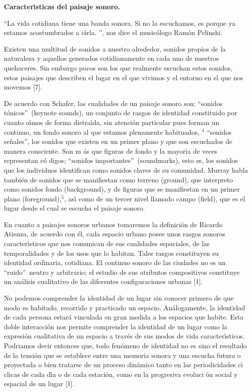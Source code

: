 \textbf{ Caracter\'{\i}sticas del paisaje sonoro.}

\textquotedblleft La vida cotidiana tiene una banda sonora. Si no la
escuchamos, es porque ya estamos acostumbrados a o\'{\i}rla.%
\textquotedblright , nos dice el music\'{o}logo Ram\'{o}n Pelinski.

Existen una multitud de sonidos a nuestro alrededor, sonidos propios de la
naturaleza y aquellos generados cotidianamente en cada uno de nuestros
quehaceres. Sin embargo pocos son los que realmente escuchan estos sonidos,
estos paisajes que describen el lugar en el que vivimos y el entorno en el
que nos movemos [7].

De acuerdo con Schafer, las cualidades de un paisaje sonoro son:
\textquotedblleft sonidos t\'{o}nicos\textquotedblright\ (keynote sounds),
un conjunto de rasgos de identidad constituido por cuanto o\'{\i}mos de
forma distra\'{\i}da, sin atenci\'{o}n particular pues forman un continuo,
un fondo sonoro al que estamos plenamente habituados, $^{4}$
\textquotedblleft sonidos se\~{n}ales\textquotedblright , los sonidos que
existen en un primer plano y que son escuchados de manera consciente. Son m%
\'{a}s que figuras de fondo y la mayor\'{\i}a de veces representan c\'{o}%
digos; \textquotedblleft sonidos importantes\textquotedblright\
(soundmarks), esto es, los sonidos que los individuos identifican como
sonidos claves de su comunidad. Murray habla tambi\'{e}n de sonidos que se
manifiestan como terreno (ground), que interpreto como sonidos fondo
(background), y de figuras que se manifiestan en un primer plano
(foreground),$^{5}$, as\'{\i} como de un tercer nivel llamado campo (field),
que es el lugar desde el cual se escucha el paisaje sonoro.

En cuanto a paisajes sonoros urbanos tomaremos la definici\'{o}n de Ricardo
Atienza, de acuerdo con \'{e}l, cada espacio urbano posee unos rasgos
sonoros caracter\'{\i}sticos que nos comunican de sus cualidades espaciales,
de las temporalidades y de los usos que lo habitan. Tales rasgos constituyen
su identidad ordinaria, cotidiana. El continuo sonoro de las ciudades no es
un \textquotedblleft ruido\textquotedblright\ neutro y arbitrario; el
estudio de sus atributos compositivos constituye un an\'{a}lisis cualitativo
de las diferentes configuraciones urbanas [1].

No podemos comprender la identidad de un lugar sin conocer primero de que
modo es habitado, recorrido y practicado un espacio. An\'{a}logamente, la
identidad de cada persona estar\'{a} vinculada en gran medida a los espacios
que habite. Esta doble interacci\'{o}n nos permite comprender la identidad
de un lugar como la expresi\'{o}n cualitativa de un espacio a trav\'{e}s de
sus modos de vida caracter\'{\i}sticos. Podriamos decir entonces que, todo
fen\'{o}meno de identidad no es sino el resultado de la tensi\'{o}n que se
establece entre una memoria sonora y una escucha futura o proyectada o bien
tratarse de un proceso din\'{a}mico tanto en las periodicidades c\'{\i}%
clicas de cada d\'{\i}a o de cada estaci\'{o}n, como en la progresiva evoluci%
\'{o}n social y espacial de un lugar [1].


